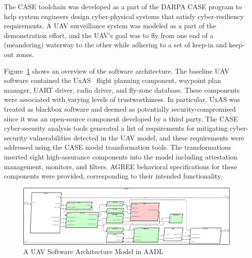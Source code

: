 

 
The CASE toolchain was developed as a part of the DARPA CASE program to help system engineers design cyber-physical systems that satisfy cyber-resiliency requirements.
A UAV surveillance system was modeled as a part of the demonstration effort,
and the UAV's goal was to fly from one end of a (meandering) waterway to the other while adhering to a set of keep-in and keep-out zones.

Figure~\ref{SW} shows an overview of the software architecture.
The baseline UAV software contained the UxAS~\cite{uxas} flight planning component, waypoint plan manager, UART driver, radio driver, and fly-zone database.
These components were associated with varying levels of trustworthiness.
In particular, UxAS was treated as blackbox software and deemed as potentially security-compromised since it was an open-source component developed by a third party.
The CASE cyber-security analysis tools generated a list of requirements for mitigating cyber-security vulnerabilities detected in the UAV model,
and these requirements were addressed using the CASE model transformation tools.
The transformations inserted eight high-assurance components into the model including attestation management, monitors, and filters.
AGREE behavioral specifications for these components were provided, corresponding to their intended functionality.

\begin{figure}[t!]
\centering
\includegraphics[width=120mm]{sw3.png}
\caption{A UAV Software Architecture Model in AADL \label{SW}}
\end{figure}

